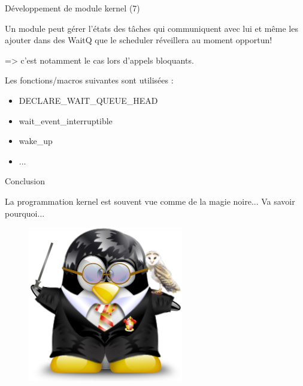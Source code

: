 \documentclass[12pt, t]{beamer}
\newcommand{\bi}{\begin{itemize}}
\newcommand{\ei}{\end{itemize}}
\begin{document}
\begin{frame}{Développement de module kernel (7)}

    \vspace{15pt}
    Un module peut gérer l'états des tâches qui communiquent avec lui et même
    les ajouter dans des WaitQ que le scheduler réveillera au moment opportun!

    \vspace{15pt}
    => c'est notamment le cas lors d'appels bloquants.

    {
        \vspace{15pt}
        Les fonctions/macros suivantes sont utilisées :
        \bi
        \item DECLARE\_WAIT\_QUEUE\_HEAD
        \item wait\_event\_interruptible
        \item wake\_up
        \item ...
        \ei
    }

\end{frame}

\begin{frame}{Conclusion}

    \centering
    \vspace{20pt}
    \LARGE{
        La programmation kernel est souvent vue comme de la magie noire... Va
        savoir pourquoi...

        \begin{figure}
            \centering
            \includegraphics[scale=0.35]{magic.png}
        \end{figure}
    }

\end{frame}
\end{document}
